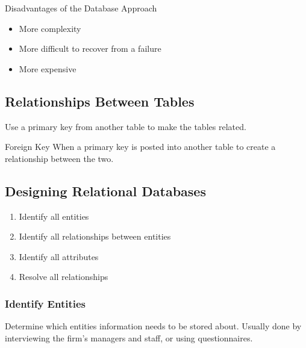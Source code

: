 \documentclass[\main/notes.tex]{subfiles}
\begin{document}
			\begin{sidenote}{Disadvantages of the Database Approach}
				\begin{multicols}{2}
					\begin{itemize}
						\item More complexity
						\item More difficult to recover from a failure
						\item More expensive
					\end{itemize}
				\end{multicols}
			\end{sidenote}
			\subsection{Relationships Between Tables}
				Use a primary key from another table to make the tables related.
				\begin{definition}{Foreign Key}
					When a primary key is posted into another table to create a relationship between the two.
				\end{definition}
			\subsection{Designing Relational Databases}
				\begin{enumerate}[nosep]
					\item Identify all entities
					\item Identify all relationships between entities
					\item Identify all attributes
					\item Resolve all relationships
				\end{enumerate}
				\subsubsection{Identify Entities}
					Determine which entities information needs to be stored about. Usually done by interviewing the firm's managers and staff, or using questionnaires.
\end{document}
